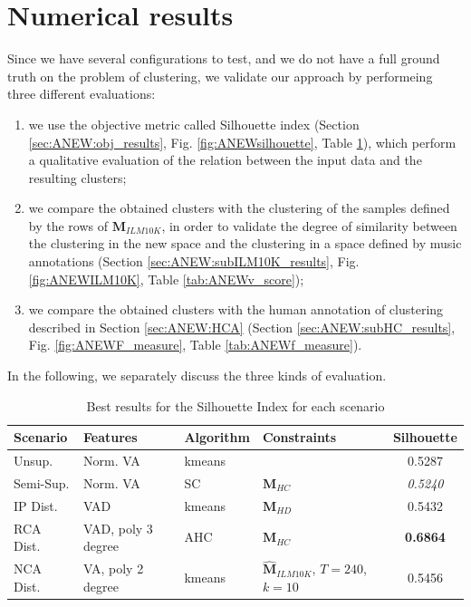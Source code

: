 \section{Numerical results}
Since we have several configurations to test, and we do not have a full ground truth on the problem of clustering, we validate our approach by performeing three different evaluations:
\begin{enumerate}
\item we use the objective metric called Silhouette index (Section \ref{sec:ANEW:obj_results}, Fig. \ref{fig:ANEWsilhouette}, Table \ref{tab:ANEWsilhouette}),  which perform a qualitative evaluation of the relation between the input data and the resulting clusters;
\item we compare the obtained clusters with the clustering of the samples defined by the rows of $\mathbf{M}_{ILM10K}$, in order to validate the degree of similarity between the clustering in the new space and the clustering in a space defined by music annotations (Section \ref{sec:ANEW:subILM10K_results}, Fig. \ref{fig:ANEWILM10K}, Table \ref{tab:ANEWv_score});
\item we compare the obtained clusters with the human annotation of clustering described in Section \ref{sec:ANEW:HCA} (Section \ref{sec:ANEW:subHC_results}, Fig. \ref{fig:ANEWF_measure}, Table \ref{tab:ANEWf_measure}).
\end{enumerate}

In the following, we separately discuss the three kinds of evaluation.



\begin{table}[tbp]
\begin{center}
  \bgroup
  \def\arraystretch{1.5}
\begin{tabular}{ ||l |l |l |l  |c||}
\hline
\hline
Scenario & Features & Algorithm & Constraints & Silhouette \\
\hline
\hline
Unsup. & Norm. VA & kmeans & & 0.5287 \\
\hline
Semi-Sup. & Norm. VA & SC & $\mathbf{{M}}_{HC}$ & {\color[HTML]{8E0000} \textit{0.5240}} \\
\hline
IP Dist. & VAD & kmeans & $\mathbf{{M}}_{HD}$  & 0.5432 \\
\hline
RCA Dist. & VAD, poly 3 degree & AHC & $\mathbf{{M}}_{HC}$ & {\color[HTML]{326B00}  \textbf{0.6864}} \\
\hline
NCA Dist. & VA, poly 2 degree & kmeans & $\mathbf{\hat{M}}_{ILM10K}$, $T=240$, $k=10$ & 0.5456 \\
\hline
\hline
\end{tabular}\quad
\egroup
\end{center}
\caption{Best results for the Silhouette Index for each scenario}
\label{tab:ANEWsilhouette}
\end{table}



